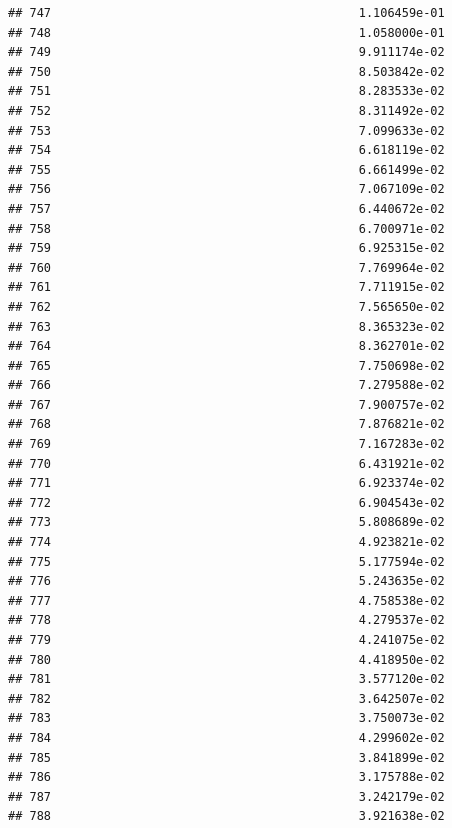 \documentclass[
]{article}
\begin{document}
\begin{verbatim}
## 747                                           1.106459e-01
## 748                                           1.058000e-01
## 749                                           9.911174e-02
## 750                                           8.503842e-02
## 751                                           8.283533e-02
## 752                                           8.311492e-02
## 753                                           7.099633e-02
## 754                                           6.618119e-02
## 755                                           6.661499e-02
## 756                                           7.067109e-02
## 757                                           6.440672e-02
## 758                                           6.700971e-02
## 759                                           6.925315e-02
## 760                                           7.769964e-02
## 761                                           7.711915e-02
## 762                                           7.565650e-02
## 763                                           8.365323e-02
## 764                                           8.362701e-02
## 765                                           7.750698e-02
## 766                                           7.279588e-02
## 767                                           7.900757e-02
## 768                                           7.876821e-02
## 769                                           7.167283e-02
## 770                                           6.431921e-02
## 771                                           6.923374e-02
## 772                                           6.904543e-02
## 773                                           5.808689e-02
## 774                                           4.923821e-02
## 775                                           5.177594e-02
## 776                                           5.243635e-02
## 777                                           4.758538e-02
## 778                                           4.279537e-02
## 779                                           4.241075e-02
## 780                                           4.418950e-02
## 781                                           3.577120e-02
## 782                                           3.642507e-02
## 783                                           3.750073e-02
## 784                                           4.299602e-02
## 785                                           3.841899e-02
## 786                                           3.175788e-02
## 787                                           3.242179e-02
## 788                                           3.921638e-02

\end{verbatim}
\end{document}
